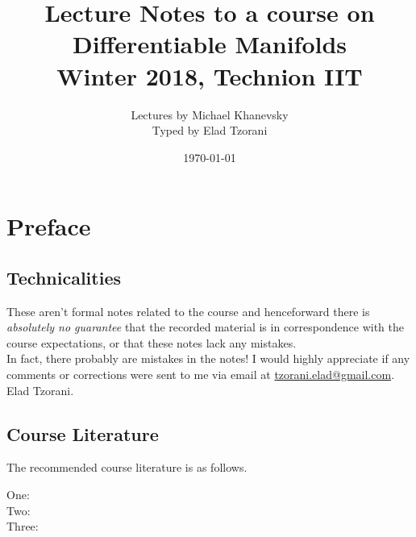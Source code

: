 \documentclass[10pt,a4paper,twoside,openany,hidelinks]{book}
\title{Lecture Notes to a course on Differentiable Manifolds \\ \large{Winter 2018, Technion IIT}}
\author{Lectures by Michael Khanevsky \\ \large Typed by Elad Tzorani}
\date{\today}
\begin{document}
\frontmatter
{}
\tableofcontents
\countlectures
\newpage

\chapter*{Preface}
 

\section*{Technicalities}

These aren't formal notes related to the course and henceforward there is \emph{absolutely no guarantee} that the recorded material is in correspondence with the course expectations, or that these notes lack any mistakes.\\
In fact, there probably are mistakes in the notes! I would highly appreciate if any comments or corrections were sent to me via email at \href{mailto:tzorani.elad@gmail.com}{tzorani.elad@gmail.com}.\\
Elad Tzorani.

\section*{Course Literature}

The recommended course literature is as follows.
\begin{description}
\item[One:]

\item[Two:]

\item[Three:]
\end{description}

\mainmatter


\backmatter
\end{document}
